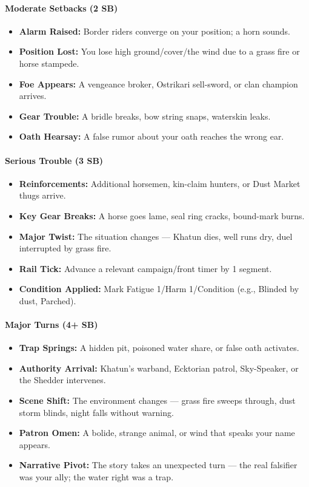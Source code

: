 {{\paragraph{Moderate Setbacks (2 SB)}
\begin{itemize}
\item \textbf{Alarm Raised:} Border riders converge on your position; a horn sounds.
\item \textbf{Position Lost:} You lose high ground/cover/the wind due to a grass fire or horse stampede.
\item \textbf{Foe Appears:} A vengeance broker, Ostrikari sell-sword, or clan champion arrives.
\item \textbf{Gear Trouble:} A bridle breaks, bow string snaps, waterskin leaks.
\item \textbf{Oath Hearsay:} A false rumor about your oath reaches the wrong ear.
\end{itemize}

\paragraph{Serious Trouble (3 SB)}
\begin{itemize}
\item \textbf{Reinforcements:} Additional horsemen, kin-claim hunters, or Dust Market thugs arrive.
\item \textbf{Key Gear Breaks:} A horse goes lame, seal ring cracks, bound-mark burns.
\item \textbf{Major Twist:} The situation changes --- Khatun dies, well runs dry, duel interrupted by grass fire.
\item \textbf{Rail Tick:} Advance a relevant campaign/front timer by 1 segment.
\item \textbf{Condition Applied:} Mark Fatigue 1/Harm 1/Condition (e.g., Blinded by dust, Parched).
\end{itemize}

\paragraph{Major Turns (4+ SB)}
\begin{itemize}
\item \textbf{Trap Springs:} A hidden pit, poisoned water share, or false oath activates.
\item \textbf{Authority Arrival:} Khatun's warband, Ecktorian patrol, Sky-Speaker, or the Shedder intervenes.
\item \textbf{Scene Shift:} The environment changes --- grass fire sweeps through, dust storm blinds, night falls without warning.
\item \textbf{Patron Omen:} A bolide, strange animal, or wind that speaks your name appears.
\item \textbf{Narrative Pivot:} The story takes an unexpected turn --- the real falsifier was your ally; the water right was a trap.
\end{itemize}

}}
